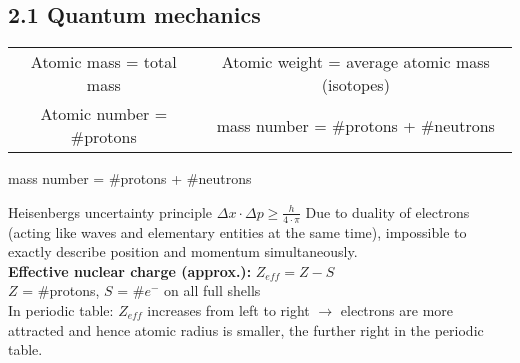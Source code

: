 \subsection{2.1 Quantum mechanics}
    \begin{scriptsize}
        \begin{tabular}{c c}
            Atomic mass = total mass & Atomic weight = average atomic mass (isotopes)\\
            Atomic number = \#protons & mass number = \#protons + \#neutrons
        \end{tabular}
    \end{scriptsize}
    
            \item mass number = \#protons + \#neutrons
        
        Heisenbergs uncertainty principle $\Delta x \cdot \Delta p \geq \frac{h}{4 \cdot \pi}$ Due to duality of electrons (acting like waves and elementary entities at the same time), impossible to exactly describe position and momentum simultaneously.\\
        \textbf{Effective nuclear charge (approx.):}   $Z_{eff} = Z-S$\\
        $Z$ = \#protons, $S$ = \#$e^-$ on all full shells
        \vspace{1mm}\\
        In periodic table: $Z_{eff}$ increases from left to right $\rightarrow$ electrons are more attracted and hence atomic radius is smaller, the further right in the periodic table.
        \vspace*{0.0em}
